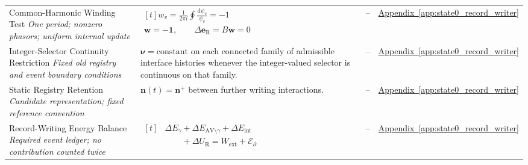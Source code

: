 \begin{longtable}{@{} p{4.5cm} p{6cm} c p{4cm} @{}}
{\raggedright Common-Harmonic Winding Test
\newline \textit{One period; nonzero phasors; uniform internal update}\par}
& {\raggedright $\begin{gathered}[t]
    w_v=\frac{1}{2\pi i}\oint\frac{\mathrm d\psi_v}{\psi_v}=-1 \\
    \mathbf w=-\mathbf 1,\qquad
    \Delta\mathbf e_{\mathrm R}=B\mathbf w=0
\end{gathered}$\par}
& --
& {\raggedright
\hyperref[app:state0_record_writer]{Appendix~\ref*{app:state0_record_writer}}
\par} \\

{\raggedright Integer-Selector Continuity Restriction
\newline \textit{Fixed old registry and event boundary conditions}\par}
& {\raggedright
$\boldsymbol{\nu}=\text{constant}$ on each connected family
of admissible interface histories whenever the integer-valued
selector is continuous on that family.
\par}
& --
& {\raggedright
\hyperref[app:state0_record_writer]{Appendix~\ref*{app:state0_record_writer}}
\par} \\

{\raggedright Static Registry Retention
\newline \textit{Candidate representation; fixed reference convention}\par}
& {\raggedright
$\mathbf n(t)=\mathbf n^{+}$
\newline between further writing interactions.
\par}
& --
& {\raggedright
\hyperref[app:state0_record_writer]{Appendix~\ref*{app:state0_record_writer}}
\par} \\

{\raggedright Record-Writing Energy Balance
\newline \textit{Required event ledger; no contribution counted twice}\par}
& {\raggedright $\begin{aligned}[t]
    &\Delta E_\gamma
      +\Delta E_{\mathrm{AV}\setminus\gamma}
      +\Delta E_{\mathrm{int}} \\
    &\qquad+\Delta U_{\mathrm R}
      =W_{\mathrm{ext}}+\mathcal E_{\partial}
\end{aligned}$\par}
& --
& {\raggedright
\hyperref[app:state0_record_writer]{Appendix~\ref*{app:state0_record_writer}}
\par} \\


\end{longtable}

